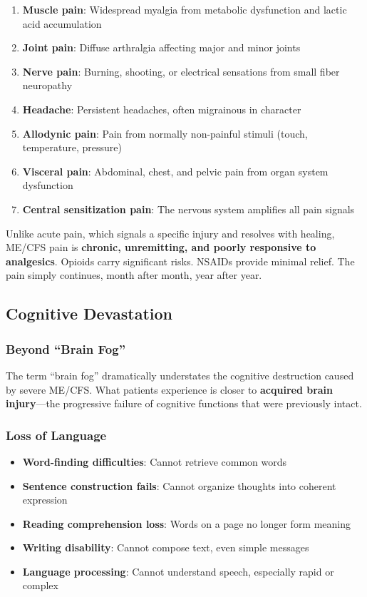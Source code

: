 \begin{enumerate}
    \item \textbf{Muscle pain}: Widespread myalgia from metabolic dysfunction and lactic acid accumulation
    \item \textbf{Joint pain}: Diffuse arthralgia affecting major and minor joints
    \item \textbf{Nerve pain}: Burning, shooting, or electrical sensations from small fiber neuropathy
    \item \textbf{Headache}: Persistent headaches, often migrainous in character
    \item \textbf{Allodynic pain}: Pain from normally non-painful stimuli (touch, temperature, pressure)
    \item \textbf{Visceral pain}: Abdominal, chest, and pelvic pain from organ system dysfunction
    \item \textbf{Central sensitization pain}: The nervous system amplifies all pain signals
\end{enumerate}

Unlike acute pain, which signals a specific injury and resolves with healing, ME/CFS pain is \textbf{chronic, unremitting, and poorly responsive to analgesics}. Opioids carry significant risks. NSAIDs provide minimal relief. The pain simply continues, month after month, year after year.

\subsection{Cognitive Devastation}
\label{sec:severe-cognitive}

\subsubsection{Beyond ``Brain Fog''}
\label{subsec:beyond-brainfog}

The term ``brain fog'' dramatically understates the cognitive destruction caused by severe ME/CFS. What patients experience is closer to \textbf{acquired brain injury}---the progressive failure of cognitive functions that were previously intact.

\subsubsection{Loss of Language}

\begin{itemize}
    \item \textbf{Word-finding difficulties}: Cannot retrieve common words
    \item \textbf{Sentence construction fails}: Cannot organize thoughts into coherent expression
    \item \textbf{Reading comprehension loss}: Words on a page no longer form meaning
    \item \textbf{Writing disability}: Cannot compose text, even simple messages
    \item \textbf{Language processing}: Cannot understand speech, especially rapid or complex
\end{itemize}

